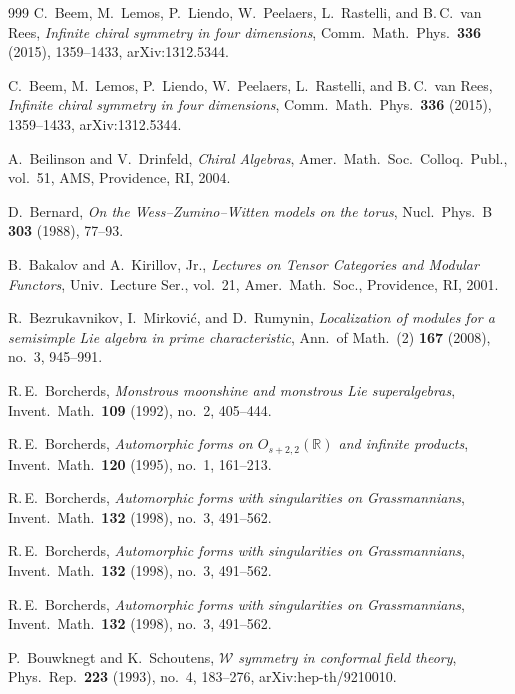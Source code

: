 \documentclass[11pt]{memoir}
\begin{document}
\begin{thebibliography}{999}
C.~Beem, M.~Lemos, P.~Liendo, W.~Peelaers, L.~Rastelli, and B.\,C.~van Rees, \emph{Infinite chiral symmetry in four dimensions}, Comm.\ Math.\ Phys.\ \textbf{336} (2015), 1359--1433, arXiv:1312.5344.

C.~Beem, M.~Lemos, P.~Liendo, W.~Peelaers, L.~Rastelli, and B.\,C.~van Rees, \emph{Infinite chiral symmetry in four dimensions}, Comm.\ Math.\ Phys.\ \textbf{336} (2015), 1359--1433, arXiv:1312.5344.

A.~Beilinson and V.~Drinfeld, \emph{Chiral Algebras}, Amer.\ Math.\ Soc.\ Colloq.\ Publ., vol.~51, AMS, Providence, RI, 2004.

D.~Bernard, \emph{On the Wess--Zumino--Witten models on the torus}, Nucl.\ Phys.\ B \textbf{303} (1988), 77--93.

B.~Bakalov and A.~Kirillov, Jr., \emph{Lectures on Tensor Categories and Modular Functors}, Univ.\ Lecture Ser., vol.~21, Amer.\ Math.\ Soc., Providence, RI, 2001.

R.~Bezrukavnikov, I.~Mirkovi\'c, and D.~Rumynin, \emph{Localization of modules for a semisimple Lie algebra in prime characteristic}, Ann.\ of Math.\ (2) \textbf{167} (2008), no.~3, 945--991.

R.\,E.~Borcherds, \emph{Monstrous moonshine and monstrous Lie superalgebras}, Invent.\ Math.\ \textbf{109} (1992), no.~2, 405--444.

R.\,E.~Borcherds, \emph{Automorphic forms on $O_{s+2,2}(\mathbb R)$ and infinite products}, Invent.\ Math.\ \textbf{120} (1995), no.~1, 161--213.

R.\,E.~Borcherds, \emph{Automorphic forms with singularities on Grassmannians}, Invent.\ Math.\ \textbf{132} (1998), no.~3, 491--562.

R.\,E.~Borcherds, \emph{Automorphic forms with singularities on Grassmannians}, Invent.\ Math.\ \textbf{132} (1998), no.~3, 491--562.

R.\,E.~Borcherds, \emph{Automorphic forms with singularities on Grassmannians}, Invent.\ Math.\ \textbf{132} (1998), no.~3, 491--562.

P.~Bouwknegt and K.~Schoutens, \emph{$\mathcal{W}$ symmetry in conformal field theory}, Phys.\ Rep.\ \textbf{223} (1993), no.~4, 183--276, arXiv:hep-th/9210010.


\end{thebibliography}
\end{document}
